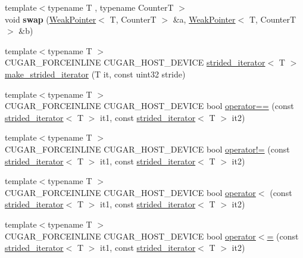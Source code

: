 \begin{DoxyCompactItemize}
\item 
\mbox{\label{namespacecugar_a8aeb40a2ae92158e95208ffea34bcf03}} 
{\footnotesize template$<$typename T , typename CounterT $>$ }\\void {\bfseries swap} (\hyperlink{classcugar_1_1_weak_pointer}{Weak\+Pointer}$<$ T, CounterT $>$ \&a, \hyperlink{classcugar_1_1_weak_pointer}{Weak\+Pointer}$<$ T, CounterT $>$ \&b)
\item 
{\footnotesize template$<$typename T $>$ }\\C\+U\+G\+A\+R\+\_\+\+F\+O\+R\+C\+E\+I\+N\+L\+I\+NE C\+U\+G\+A\+R\+\_\+\+H\+O\+S\+T\+\_\+\+D\+E\+V\+I\+CE \hyperlink{structcugar_1_1strided__iterator}{strided\+\_\+iterator}$<$ T $>$ \hyperlink{group___iterators_ga18b4b42492eb7224bb23b6d7703d59d3}{make\+\_\+strided\+\_\+iterator} (T it, const uint32 stride)
\item 
{\footnotesize template$<$typename T $>$ }\\C\+U\+G\+A\+R\+\_\+\+F\+O\+R\+C\+E\+I\+N\+L\+I\+NE C\+U\+G\+A\+R\+\_\+\+H\+O\+S\+T\+\_\+\+D\+E\+V\+I\+CE bool \hyperlink{group___iterators_ga72e24473e98fc1cd1bd45b9e55e154ec}{operator==} (const \hyperlink{structcugar_1_1strided__iterator}{strided\+\_\+iterator}$<$ T $>$ it1, const \hyperlink{structcugar_1_1strided__iterator}{strided\+\_\+iterator}$<$ T $>$ it2)
\item 
{\footnotesize template$<$typename T $>$ }\\C\+U\+G\+A\+R\+\_\+\+F\+O\+R\+C\+E\+I\+N\+L\+I\+NE C\+U\+G\+A\+R\+\_\+\+H\+O\+S\+T\+\_\+\+D\+E\+V\+I\+CE bool \hyperlink{group___iterators_ga716fb525ff65fc5c8224b1e46979e8a8}{operator!=} (const \hyperlink{structcugar_1_1strided__iterator}{strided\+\_\+iterator}$<$ T $>$ it1, const \hyperlink{structcugar_1_1strided__iterator}{strided\+\_\+iterator}$<$ T $>$ it2)
\item 
{\footnotesize template$<$typename T $>$ }\\C\+U\+G\+A\+R\+\_\+\+F\+O\+R\+C\+E\+I\+N\+L\+I\+NE C\+U\+G\+A\+R\+\_\+\+H\+O\+S\+T\+\_\+\+D\+E\+V\+I\+CE bool \hyperlink{group___iterators_ga7e34173347793a8a35add6b79d2b1c2b}{operator$<$} (const \hyperlink{structcugar_1_1strided__iterator}{strided\+\_\+iterator}$<$ T $>$ it1, const \hyperlink{structcugar_1_1strided__iterator}{strided\+\_\+iterator}$<$ T $>$ it2)
\item 
{\footnotesize template$<$typename T $>$ }\\C\+U\+G\+A\+R\+\_\+\+F\+O\+R\+C\+E\+I\+N\+L\+I\+NE C\+U\+G\+A\+R\+\_\+\+H\+O\+S\+T\+\_\+\+D\+E\+V\+I\+CE bool \hyperlink{group___iterators_ga863ca4b5ec73bff722711892c9468f44}{operator$<$=} (const \hyperlink{structcugar_1_1strided__iterator}{strided\+\_\+iterator}$<$ T $>$ it1, const \hyperlink{structcugar_1_1strided__iterator}{strided\+\_\+iterator}$<$ T $>$ it2)

\end{DoxyCompactItemize}
